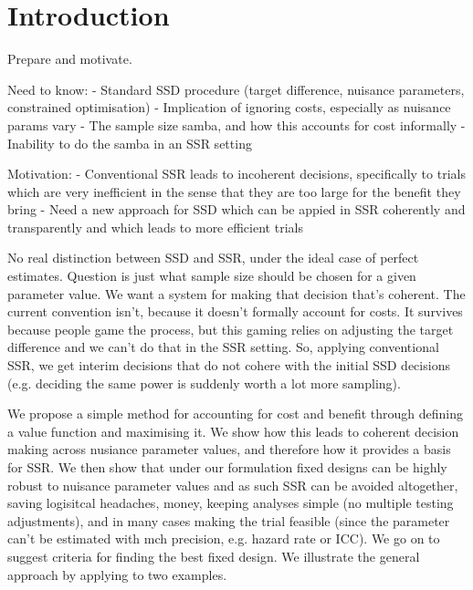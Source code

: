 \documentclass[sagev]{sagej}
\begin{document}

\maketitle



\section{Introduction}\label{sec:intro}

Prepare and motivate.

Need to know:
- Standard SSD procedure (target difference, nuisance parameters, constrained optimisation)
- Implication of ignoring costs, especially as nuisance params vary
- The sample size samba, and how this accounts for cost informally
- Inability to do the samba in an SSR setting

Motivation:
- Conventional SSR leads to incoherent decisions, specifically to trials which are very inefficient in the sense that they are too large for the benefit they bring
- Need a new approach for SSD which can be appied in SSR coherently and transparently and which leads to more efficient trials






No real distinction between SSD and SSR, under the ideal case of perfect estimates. Question is just what sample size should be chosen for a given parameter value. We want a system for making that decision that's coherent. The current convention isn't, because it doesn't formally account for costs. It survives because people game the process, but this gaming relies on adjusting the target difference and we can't do that in the SSR setting. So, applying conventional SSR, we get interim decisions that do not cohere with the initial SSD decisions (e.g. deciding the same power is suddenly worth a lot more sampling).

We propose a simple method for accounting for cost and benefit through defining a value function and maximising it. We show how this leads to coherent decision making across nusiance parameter values, and therefore how it provides a basis for SSR. We then show that under our formulation fixed designs can be highly robust to nuisance parameter values and as such SSR can be avoided altogether, saving logisitcal headaches, money, keeping analyses simple (no multiple testing adjustments), and in many cases making the trial feasible (since the parameter can't be estimated with mch precision, e.g. hazard rate or ICC). We go on to suggest criteria for finding the best fixed design. We illustrate the general approach by applying to two examples.
\end{document}
